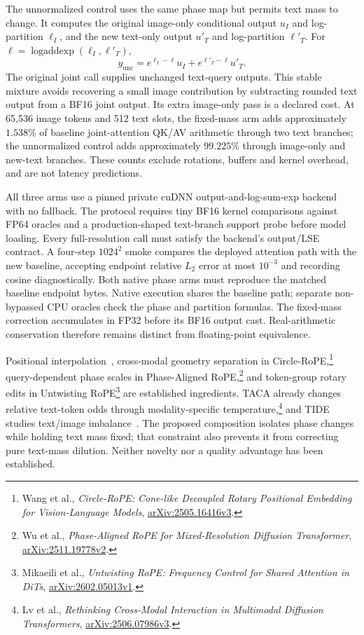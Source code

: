 The unnormalized control uses the same phase map but permits text mass to
change. It computes the original image-only conditional output $u_I$ and
log-partition $\ell_I$, and the new text-only output $u'_T$ and
log-partition $\ell'_T$. For $\ell=\operatorname{logaddexp}(\ell_I,\ell'_T)$,
\begin{equation}
 y_{\mathrm{unc}}=e^{\ell_I-\ell}u_I+e^{\ell'_T-\ell}u'_T.
\end{equation}
The original joint call supplies unchanged text-query outputs. This stable
mixture avoids recovering a small image contribution by subtracting rounded
text output from a BF16 joint output. Its extra image-only pass is a declared
cost. At 65,536 image tokens and 512 text slots, the fixed-mass arm adds
approximately $1.538\%$ of baseline joint-attention QK/AV arithmetic through
two text branches; the unnormalized control adds approximately $99.225\%$
through image-only and new-text branches. These counts exclude rotations,
buffers and kernel overhead, and are not latency predictions.

All three arms use a pinned private cuDNN output-and-log-sum-exp backend with
no fallback. The protocol requires tiny BF16 kernel comparisons against FP64
oracles and a production-shaped text-branch support probe before model loading.
Every full-resolution call must satisfy the backend's output/LSE contract.
A four-step $1024^2$ smoke compares the deployed attention path with the new
baseline, accepting endpoint relative $L_2$ error at most $10^{-3}$ and recording
cosine diagnostically. Both native phase arms must reproduce the matched
baseline endpoint bytes. Native execution shares the baseline path; separate
non-bypassed CPU oracles check the phase and partition formulas. The fixed-mass
correction accumulates in FP32 before its BF16 output cast. Real-arithmetic
conservation therefore remains distinct from floating-point equivalence.

Positional interpolation~\citep{chen2023pi}, cross-modal geometry separation
in Circle-RoPE,\footnote{Wang et al., \emph{Circle-RoPE: Cone-like Decoupled
Rotary Positional Embedding for Vision-Language Models},
\href{https://arxiv.org/abs/2505.16416v3}{arXiv:2505.16416v3}.}
query-dependent phase scales in Phase-Aligned RoPE,\footnote{Wu et al.,
\emph{Phase-Aligned RoPE for Mixed-Resolution Diffusion Transformer},
\href{https://arxiv.org/abs/2511.19778v2}{arXiv:2511.19778v2}.}
and token-group rotary edits in Untwisting RoPE\footnote{Mikaeili et al.,
\emph{Untwisting RoPE: Frequency Control for Shared Attention in DiTs},
\href{https://arxiv.org/abs/2602.05013v1}{arXiv:2602.05013v1}.}
are established ingredients. TACA already changes relative text-token odds
through modality-specific temperature,\footnote{Lv et al., \emph{Rethinking
Cross-Modal Interaction in Multimodal Diffusion Transformers},
\href{https://arxiv.org/abs/2506.07986v3}{arXiv:2506.07986v3}.}
and TIDE studies text/image imbalance~\citep{tide2026}. The proposed composition
isolates phase changes while holding text mass fixed; that constraint also
prevents it from correcting pure text-mass dilution. Neither novelty nor a
quality advantage has been established.

